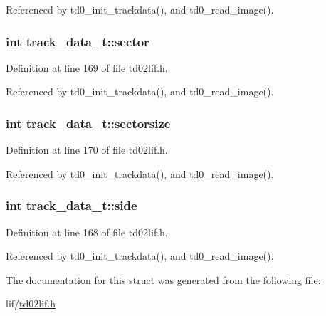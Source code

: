 Referenced by td0\+\_\+init\+\_\+trackdata(), and td0\+\_\+read\+\_\+image().

\subsubsection[{\texorpdfstring{sector}{sector}}]{\setlength{\rightskip}{0pt plus 5cm}int track\+\_\+data\+\_\+t\+::sector}\hypertarget{structtrack__data__t_ae6674e039871b8f8761a72b65b841980}{}\label{structtrack__data__t_ae6674e039871b8f8761a72b65b841980}


Definition at line 169 of file td02lif.\+h.



Referenced by td0\+\_\+init\+\_\+trackdata(), and td0\+\_\+read\+\_\+image().

\subsubsection[{\texorpdfstring{sectorsize}{sectorsize}}]{\setlength{\rightskip}{0pt plus 5cm}int track\+\_\+data\+\_\+t\+::sectorsize}\hypertarget{structtrack__data__t_a47c9f9fe17b64f31783970ef839f176c}{}\label{structtrack__data__t_a47c9f9fe17b64f31783970ef839f176c}


Definition at line 170 of file td02lif.\+h.



Referenced by td0\+\_\+init\+\_\+trackdata(), and td0\+\_\+read\+\_\+image().

\subsubsection[{\texorpdfstring{side}{side}}]{\setlength{\rightskip}{0pt plus 5cm}int track\+\_\+data\+\_\+t\+::side}\hypertarget{structtrack__data__t_a811847944e1571164ea32b48a07b0c3e}{}\label{structtrack__data__t_a811847944e1571164ea32b48a07b0c3e}


Definition at line 168 of file td02lif.\+h.



Referenced by td0\+\_\+init\+\_\+trackdata(), and td0\+\_\+read\+\_\+image().



The documentation for this struct was generated from the following file\+:\begin{DoxyCompactItemize}
\item 
lif/\hyperlink{td02lif_8h}{td02lif.\+h}\end{DoxyCompactItemize}
